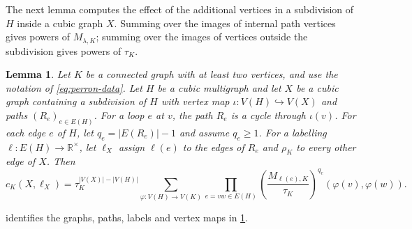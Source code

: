 \documentclass[10pt,a4paper]{article}
\theoremstyle{plain}
\newtheorem{lemma}[theorem]{Lemma}
\theoremstyle{definition}
\newcommand{\R}{\mathbb{R}}
\begin{document}
The next lemma computes the effect of the additional vertices in a
subdivision of $H$ inside a cubic graph $X$.
Summing over the images of internal path vertices gives powers of $M_{\lambda,K}$;
summing over the images of vertices outside the subdivision gives powers of $\tau_K$.
\begin{lemma}\label{lem:perron-transfer}
 Let $K$ be a connected graph with at least two vertices, and use the notation of
 \cref{eq:perron-data}. Let $H$ be a cubic multigraph and let $X$ be a
 cubic graph containing a subdivision of $H$ with vertex map
 $\iota:V(H)\hookrightarrow V(X)$ and paths $(R_e)_{e\in E(H)}$.
 For a loop $e$ at $v$, the path $R_e$ is a cycle through $\iota(v)$.
 For each edge $e$ of $H$, let $q_e=|E(R_e)|-1$ and assume $q_e\geq1$.
 For a labelling $\ell:E(H)\to\R^\times$, let $\ell_X$ assign
 $\ell(e)$ to the edges of $R_e$ and $\rho_K$ to every other edge of $X$.
 Then
 \begin{equation}\label{eq:perron-transfer}
  c_K(X,\ell_X)=\tau_K^{|V(X)|-|V(H)|}
    \sum_{\varphi:V(H)\to V(K)}
    \prod_{e=vw\in E(H)}
      \left(\frac{M_{\ell(e),K}}{\tau_K}\right)^{q_e}(\varphi(v),\varphi(w)).
 \end{equation}
\end{lemma}
\noindent{} identifies the graphs, paths, labels and vertex maps
in \cref{lem:perron-transfer}.
\end{document}
